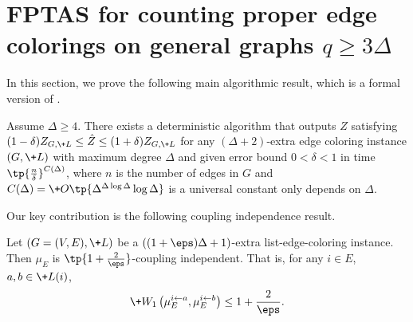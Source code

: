 \documentclass[a4paper,11pt]{article}
\newcommand{\pin}{\leftarrow}
\newcommand{\W}[1]{\+W_1\left(#1\right)}
\begin{document}
\newcommand{\ma}{\mu_{E-i}^{i\pin a}}
\newcommand{\mb}{\mu_{E-i}^{i\pin b}}
\newcommand{\mab}{\mu_{E-i}^{\substack{i\pin a\\j\pin b}}}
\newcommand{\mba}{\mu_{E-i}^{\substack{i\pin b\\j\pin a}}}
\newcommand{\man}{\mu_{E-i}^{\substack{i\pin a\\b\notin N}}}
\newcommand{\mbn}{\mu_{E-i}^{\substack{i\pin b\\a\notin N}}}
\renewcommand{\pab}{\mu_{E-i}^{i\pin a}(j\pin b)}
\newcommand{\pba}{\mu_{E-i}^{i\pin b}(j\pin a)}
\newcommand{\pan}{\mu_{E-i}^{i\pin a}(b\notin N)}
\newcommand{\pbn}{\mu_{E-i}^{i\pin b}(a\notin N)}
\newcommand{\sjn}{\sum_{j\in N}}
\newcommand{\sj}{\sum_{j}}

\newcommand{\zzz}{1+\sum_k(\gamma_k\vee\delta_k)}



\section{FPTAS for counting proper edge colorings on general graphs $q\ge 3\Delta$}\label{sec:FPTAS}


In this section, we prove the following main algorithmic result, which is a formal version of .
\begin{theorem}\label{thm:FPTAS}
    Assume $\Delta\geq 4$. There exists a deterministic algorithm that outputs $\hat{Z}$ satisfying $(1-\delta)Z_{G,\+L}\leq \hat{Z}\leq (1+\delta)Z_{G,\+L}$ for any $(\Delta + 2)$-extra edge coloring instance $(G,\+L)$ with maximum degree $\Delta$ and given error bound $0<\delta <1$ in time $\tp{\frac{n}{\delta}}^{C(\Delta)}$,  where $n$ is the number of edges in $G$ and $C(\Delta)=\+O\tp{\Delta^{\Delta\log \Delta}\log \Delta}$
    is a universal constant only depends on $\Delta$.
\end{theorem}

Our key contribution is the following coupling independence result.

\begin{theorem}\label{thm:coupling-independence}
    Let $(G=(V, E), \+L)$ be a $((1+\eps)\Delta+1)$-extra list-edge-coloring instance.  Then $\mu_E$ is $\tp{1+\frac{2}{\eps}}$-coupling independent. That is, for any $i\in E$, $a, b\in \+L(i)$,
    \[
    \W{\mu_E^{i\pin a}, \mu_E^{i\pin b}} \le 1 + \frac{2}{\eps}.
    \]
\end{theorem}
\end{document}
